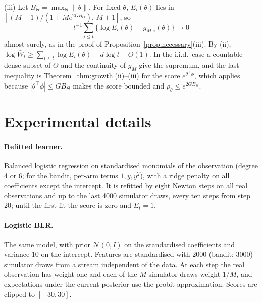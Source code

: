\documentclass[pdflatex,sn-mathphys-ay]{sn-jnl}
\theoremstyle{thmstyleone}
\theoremstyle{thmstyletwo}
\begin{document}
\begin{appendices}
(iii) Let $B_\Theta = \max_\Theta\|\theta\|$. For fixed $\theta$, $E_i(\theta)$
lies in $[(M+1)/(1 + M e^{2GB_\Theta}),\, M+1]$, so
\[
t^{-1}\textstyle\sum_{i\le t}\{\log E_i(\theta) - g_{M,i}(\theta)\} \to 0
\]
almost surely, as in the proof of
Proposition~\ref{prop:necessary}(iii). By (ii),
$\log \bar W_t \ge \sum_{i \le t} \log E_i(\theta) - d\log t - O(1)$. In the
i.i.d.\ case a countable dense subset of $\Theta$ and the continuity of $g_M$
give the supremum, and the last inequality is Theorem~\ref{thm:growth}(ii)--(iii)
for the score $e^{\theta^\top\phi}$, which applies because
$|\theta^\top\phi| \le GB_\Theta$ makes the score bounded and
$\rho_\theta \le e^{2GB_\Theta}$.

\section{Experimental details}\label{app:details}

\paragraph{Refitted learner.} Balanced logistic regression on standardised
monomials of the observation (degree 4 or 6; for the bandit, per-arm terms
$1, y, y^2$), with a ridge penalty on all coefficients except the intercept.
It is refitted by eight Newton steps on all real observations and up to the
last 4000 simulator draws, every ten steps from step 20; until the first fit
the score is zero and $E_t = 1$.

\paragraph{Logistic BLR.} The same model, with prior $\mathcal N(0, I)$ on the
standardised coefficients and variance 10 on the intercept. Features are
standardised with 2000 (bandit: 3000) simulator draws from a stream
independent of the data. At each step the real observation has weight one and
each of the $M$ simulator draws weight $1/M$, and expectations under the
current posterior use the probit approximation. Scores are clipped to
$[-30, 30]$.


\end{appendices}
\end{document}
